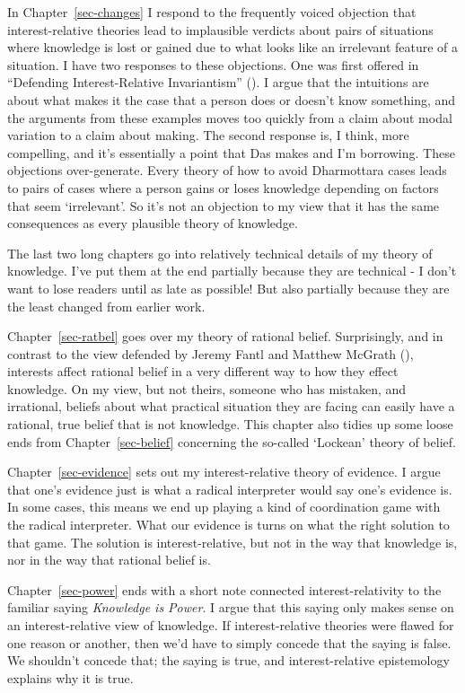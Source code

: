 \documentclass[
  10pt,
  letterpaper,
  twoside]{scrbook}
\begin{document}
In Chapter~\ref{sec-changes} I respond to the frequently voiced
objection that interest-relative theories lead to implausible verdicts
about pairs of situations where knowledge is lost or gained due to what
looks like an irrelevant feature of a situation. I have two responses to
these objections. One was first offered in ``Defending Interest-Relative
Invariantism'' ().
I argue that the intuitions are about what makes it the case that a
person does or doesn't know something, and the arguments from these
examples moves too quickly from a claim about modal variation to a claim
about making. The second response is, I think, more compelling, and it's
essentially a point that Das makes and I'm borrowing. These objections
over-generate. Every theory of how to avoid Dharmottara cases leads to
pairs of cases where a person gains or loses knowledge depending on
factors that seem `irrelevant'. So it's not an objection to my view that
it has the same consequences as every plausible theory of knowledge.

The last two long chapters go into relatively technical details of my
theory of knowledge. I've put them at the end partially because they are
technical - I don't want to lose readers until as late as possible! But
also partially because they are the least changed from earlier work.

Chapter~\ref{sec-ratbel} goes over my theory of rational belief.
Surprisingly, and in contrast to the view defended by Jeremy Fantl and
Matthew McGrath (), interests
affect rational belief in a very different way to how they effect
knowledge. On my view, but not theirs, someone who has mistaken, and
irrational, beliefs about what practical situation they are facing can
easily have a rational, true belief that is not knowledge. This chapter
also tidies up some loose ends from Chapter~\ref{sec-belief} concerning
the so-called `Lockean' theory of belief.

Chapter~\ref{sec-evidence} sets out my interest-relative theory of
evidence. I argue that one's evidence just is what a radical interpreter
would say one's evidence is. In some cases, this means we end up playing
a kind of coordination game with the radical interpreter. What our
evidence is turns on what the right solution to that game. The solution
is interest-relative, but not in the way that knowledge is, nor in the
way that rational belief is.

Chapter~\ref{sec-power} ends with a short note connected
interest-relativity to the familiar saying \emph{Knowledge is Power}. I
argue that this saying only makes sense on an interest-relative view of
knowledge. If interest-relative theories were flawed for one reason or
another, then we'd have to simply concede that the saying is false. We
shouldn't concede that; the saying is true, and interest-relative
epistemology explains why it is true.
\end{document}
